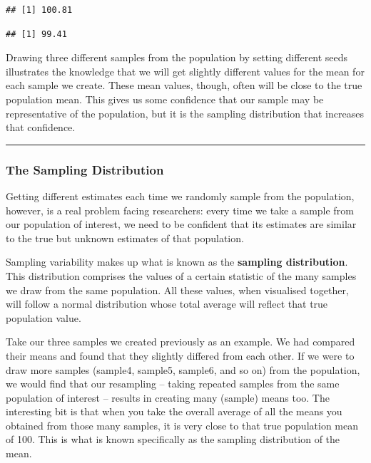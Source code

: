 \documentclass[
]{book}
\newenvironment{Shaded}{\begin{snugshade}}{\end{snugshade}}
\newcommand{\FunctionTok}[1]{\textcolor[rgb]{0.00,0.00,0.00}{#1}}
\newcommand{\NormalTok}[1]{#1}
\newcommand{\SpecialCharTok}[1]{\textcolor[rgb]{0.00,0.00,0.00}{#1}}
\begin{document}
\begin{verbatim}
## [1] 100.81
\end{verbatim}

\begin{Shaded}
\end{Shaded}

\begin{verbatim}
## [1] 99.41
\end{verbatim}

Drawing three different samples from the population by setting different seeds illustrates the knowledge that we will get slightly different values for the mean for each sample we create. These mean values, though, often will be close to the true population mean. This gives us some confidence that our sample may be representative of the population, but it is the sampling distribution that increases that confidence.

\begin{center}\rule{0.5\linewidth}{0.5pt}\end{center}

\hypertarget{the-sampling-distribution}{%
\subsubsection{The Sampling Distribution}\label{the-sampling-distribution}}

Getting different estimates each time we randomly sample from the population, however, is a real problem facing researchers: every time we take a sample from our population of interest, we need to be confident that its estimates are similar to the true but unknown estimates of that population.

Sampling variability makes up what is known as the \textbf{sampling distribution}. This distribution comprises the values of a certain statistic of the many samples we draw from the same population. All these values, when visualised together, will follow a normal distribution whose total average will reflect that true population value.

Take our three samples we created previously as an example. We had compared their means and found that they slightly differed from each other. If we were to draw more samples (sample4, sample5, sample6, and so on) from the population, we would find that our resampling -- taking repeated samples from the same population of interest -- results in creating many (sample) means too. The interesting bit is that when you take the overall average of all the means you obtained from those many samples, it is very close to that true population mean of 100. This is what is known specifically as the sampling distribution of the mean.
\end{document}
